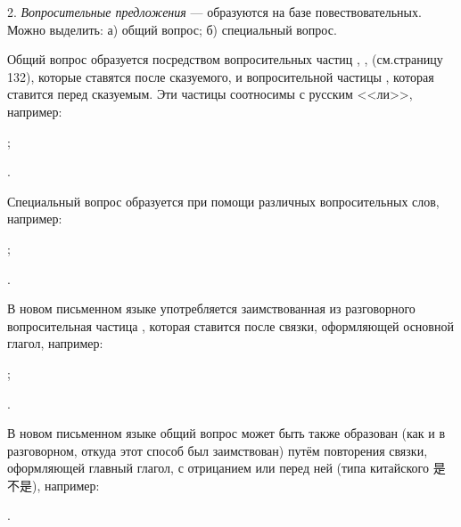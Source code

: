 2. \emph{Вопросительные предложения} --- образуются на базе повествовательных. Можно выделить: а) общий вопрос; б) специальный вопрос.

Общий вопрос образуется посредством вопросительных частиц
, ,  (см.страницу 132), которые ставятся после сказуемого, и вопросительной частицы , которая ставится перед сказуемым. Эти частицы соотносимы с русским <<ли>>, например:
\begin{prfsample}
	\item {};
	\item {}.
\end{prfsample}

Специальный вопрос образуется при помощи различных вопросительных слов, например:	
\begin{prfsample}
	\item {};
	\item {}.
\end{prfsample}

В новом письменном языке употребляется заимствованная из разговорного вопросительная частица , которая ставится после связки, оформляющей основной глагол, например:
\begin{prfsample}
	\item {};
	\item {}.
\end{prfsample}

В новом письменном языке общий вопрос может быть также образован (как и в разговорном, откуда этот способ был заимствован) путём повторения связки, оформляющей главный глагол, с отрицанием  или  перед ней (типа китайского {\chinfont 是不是}), например:
\begin{prfsample}
	\item {}.
\end{prfsample}

